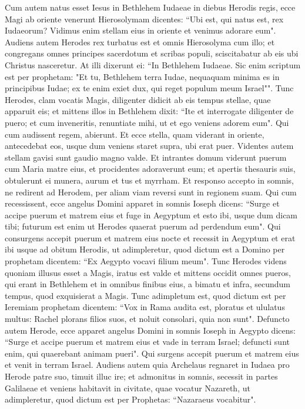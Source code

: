 \begin{biblechapter}  
\verse Cum autem natus esset Iesus in Bethlehem Iudaeae in diebus Herodis regis, ecce Magi ab oriente venerunt Hierosolymam 
\verse dicentes: “Ubi est, qui natus est, rex Iudaeorum? Vidimus enim stellam eius in oriente et venimus adorare eum". 
\verse Audiens autem Herodes rex turbatus est et omnis Hierosolyma cum illo;  
\verse et congregans omnes principes sacerdotum et scribas populi, sciscitabatur ab eis ubi Christus nasceretur. 
\verse At illi dixerunt ei: “In Bethlehem Iudaeae. Sic enim scriptum est per prophetam: 
\verse "Et tu, Bethlehem terra Iudae, nequaquam minima es in principibus Iudae; ex te enim exiet dux, qui reget populum meum Israel"". 
\verse Tunc Herodes, clam vocatis Magis, diligenter didicit ab eis tempus stellae, quae apparuit eis; 
\verse et mittens illos in Bethlehem dixit: “Ite et interrogate diligenter de puero; et cum inveneritis, renuntiate mihi, ut et ego veniens adorem eum". 
\verse Qui cum audissent regem, abierunt. Et ecce stella, quam viderant in oriente, antecedebat eos, usque dum veniens staret supra, ubi erat puer. 
\verse Videntes autem stellam gavisi sunt gaudio magno valde. 
\verse Et intrantes domum viderunt puerum cum Maria matre eius, et procidentes adoraverunt eum; et apertis thesauris suis, obtulerunt ei munera, aurum et tus et myrrham. 
\verse Et responso accepto in somnis, ne redirent ad Herodem, per aliam viam reversi sunt in regionem suam. 
\verse Qui cum recessissent, ecce angelus Domini apparet in somnis Ioseph dicens: “Surge et accipe puerum et matrem eius et fuge in Aegyptum et esto ibi, usque dum dicam tibi; futurum est enim ut Herodes quaerat puerum ad perdendum eum". 
\verse Qui consurgens accepit puerum et matrem eius nocte et recessit in Aegyptum  
\verse et erat ibi usque ad obitum Herodis, ut adimpleretur, quod dictum est a Domino per prophetam dicentem: “Ex Aegypto vocavi filium meum". 
\verse Tunc Herodes videns quoniam illusus esset a Magis, iratus est valde et mittens occidit omnes pueros, qui erant in Bethlehem et in omnibus finibus eius, a bimatu et infra, secundum tempus, quod exquisierat a Magis. 
\verse Tunc adimpletum est, quod dictum est per Ieremiam prophetam dicentem: 
\verse “Vox in Rama audita est, ploratus et ululatus multus: Rachel plorans filios suos, et noluit consolari, quia non sunt". 
\verse Defuncto autem Herode, ecce apparet angelus Domini in somnis Ioseph in Aegypto 
\verse dicens: “Surge et accipe puerum et matrem eius et vade in terram Israel; defuncti sunt enim, qui quaerebant animam pueri". 
\verse Qui surgens accepit puerum et matrem eius et venit in terram Israel. 
\verse Audiens autem quia Archelaus regnaret in Iudaea pro Herode patre suo, timuit illuc ire; et admonitus in somnis, secessit in partes Galilaeae 
\verse et veniens habitavit in civitate, quae vocatur Nazareth, ut adimpleretur, quod dictum est per Prophetas: “Nazaraeus vocabitur". 
\end{biblechapter}

